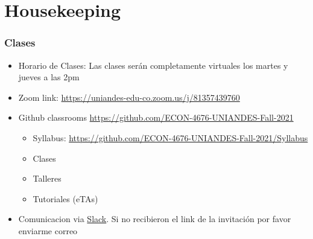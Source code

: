 \documentclass[
  shownotes,
  xcolor={svgnames},
  hyperref={colorlinks,citecolor=DarkBlue,linkcolor=DarkRed,urlcolor=DarkBlue}
  , aspectratio=169]{beamer}
\begin{document}
\section{Housekeeping}
\begin{frame}
\frametitle{Clases}


    \begin{itemize}
      \item Horario de Clases: Las clases serán completamente virtuales los martes y jueves a las 2pm
      \bigskip
      \item Zoom link: \url{https://uniandes-edu-co.zoom.us/j/81357439760}
      \bigskip
      \item Github classrooms \url{https://github.com/ECON-4676-UNIANDES-Fall-2021}
      \begin{itemize}
        \item Syllabus: \url{https://github.com/ECON-4676-UNIANDES-Fall-2021/Syllabus}
        \item Clases
        \item Talleres
        \item Tutoriales (eTAs)
        \end{itemize}
      \bigskip
      \item Comunicacion via \href{https://slack.com/}{Slack}. Si no recibieron el link de la invitación por favor enviarme correo
    \end{itemize}


\end{frame}

\end{document}
